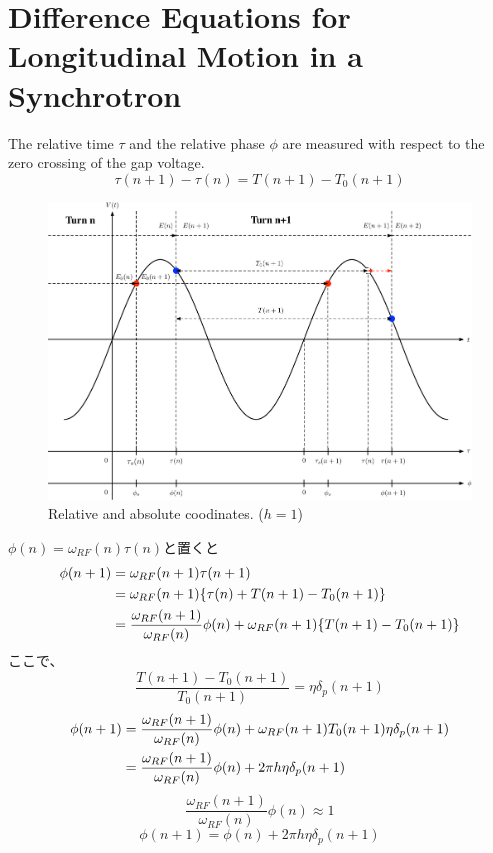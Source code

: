 \documentclass[10pt,a4paper]{ltjsarticle}
\begin{document}
\section{Difference Equations for Longitudinal Motion in a Synchrotron}
The relative time $\tau$ and the relative phase $\phi$ are measured with respect to the zero crossing of the gap voltage. 
%
\begin{equation}
    \tau(n+1) - \tau(n) = T(n+1) -T_0(n+1)
\end{equation}
%
\begin{figure}[hhbt]
    \begin{center}
      \includegraphics[width=15cm,clip]{coordinates.pdf}
      \caption{Relative and absolute coodinates. ($h=1$)}
      \label{coordinates}
    \end{center}
\end{figure}

$\phi(n) = \omega_{RF}(n) \tau(n)$と置くと
\begin{align}
    \phi(n+1) &= \omega_{RF}(n+1)\tau(n+1) \notag \\
    &=\omega_{RF}(n+1)\{\tau(n) + T(n+1) -T_0(n+1)\} \notag \\
    &= \frac{\omega_{RF}(n+1)}{\omega_{RF}(n)} \phi(n) + \omega_{RF}(n+1)\{T(n+1) -T_0(n+1)\}  \notag
\end{align}
%
ここで、
%
\begin{equation}
    \frac{T(n+1)-T_0(n+1)}{T_0(n+1)} = \eta \delta_p(n+1)
\end{equation}
%
\begin{align}
    \phi(n+1) &= \frac{\omega_{RF}(n+1)}{\omega_{RF}(n)}\phi(n) + \omega_{RF}(n+1)T_0(n+1)\eta \delta_p(n+1) \notag \\
    &=\frac{\omega_{RF}(n+1)}{\omega_{RF}(n)}\phi(n) + 2\pi h \eta \delta_p(n+1)
\end{align}
%
\begin{equation}
    \frac{\omega_{RF}(n+1)}{\omega_{RF}(n)}\phi(n) \approx 1
\end{equation}
%
\begin{equation}
    \phi(n+1) = \phi(n) + 2\pi h \eta \delta_p(n+1)
\end{equation}
\end{document}
